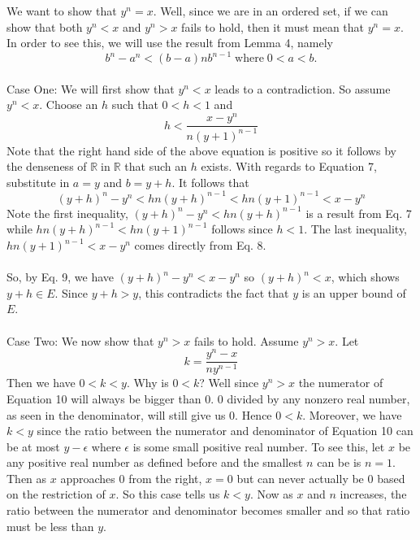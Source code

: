 \documentclass[12pt]{article}
\begin{document}
\begin{enumerate}
We want to show that $y^{n}=x$. Well, since we are in an ordered set, if we can show that both $y^{n}<x$ and $y^{n}>x$ fails to hold, then it must mean that $y^{n}=x$. In order to see this, we will use the result from Lemma 4, namely
\begin{equation}
b^{n}-a^{n} < (b-a)nb^{n-1} \; \text{where} \; 0<a<b.
\end{equation} \\ 


Case One: We will first show that $y^{n}<x$ leads to a contradiction. So assume $y^{n}<x$. Choose an $h$ such that $0<h<1$ and 
\begin{equation}
h< \dfrac{x-y^{n}}{n(y+1)^{n-1}}
\end{equation}
Note that the right hand side of the above equation is positive so it follows by the denseness of $\mathbb{R} \; \text{in} \; \mathbb{R}$ that such an $h$ exists. With regards to Equation 7, substitute in $a=y$ and $b=y+h$. It follows  that 
\begin{equation}
(y+h)^{n} - y^{n} < hn(y+h)^{n-1} < hn(y+1)^{n-1} < x-y^{n}
\end{equation}
Note the first inequality, $(y+h)^{n} - y^{n} < hn(y+h)^{n-1}$ is a result from Eq. 7 while $hn(y+h)^{n-1} < hn(y+1)^{n-1}$ follows since $h<1$. The last inequality, $hn(y+1)^{n-1} < x-y^{n}$ comes directly from Eq. 8.  \\ \\


So, by Eq. 9, we have $(y+h)^{n} - y^{n}< x-y^{n}$ so $(y+h)^{n} < x$, which shows $y+h \in E$. Since $y+h > y$, this contradicts the fact that $y$ is an upper bound of $E$. \\ \\


Case Two: We now show that $y^{n}>x$ fails to hold. Assume $y^{n}>x$. Let
\begin{equation}
k = \dfrac{y^{n}-x}{ny^{n-1}}
\end{equation}
Then we have $0<k<y$. Why is $0<k$? Well since $y^{n}>x$ the numerator of Equation 10 will always be bigger than 0. $0$ divided by any nonzero real number, as seen in the denominator, will still give us 0. Hence $0<k$. Moreover, we have $k<y$ since the ratio between the numerator and denominator of Equation 10 can be at most $y - \epsilon$ where $\epsilon$ is some small positive real number. To see this, let $x$ be any positive real number as defined before and the smallest $n$ can be is $n=1$. Then as $x$ approaches 0 from the right, $x=0$ but can never actually be $0$ based on the restriction of $x$. So this case tells us $k<y$. Now as $x$ and $n$ increases, the ratio between the numerator and denominator becomes smaller and so that ratio must be less than $y$. \\ \\


\end{enumerate}
\end{document}
